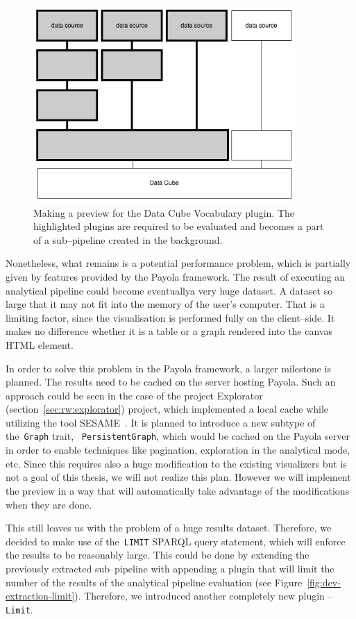 \begin{figure}
	\centering
	\includegraphics[width=100mm]{img/dcv-extraction.png}
	\caption{Making a preview for the Data Cube Vocabulary plugin. The highlighted
	plugins are required to be evaluated and becomes a part of a sub--pipeline created
	in the background.}
	\label{fig:dcv-extraction}
\end{figure}

Nonetheless, what remains is a potential performance problem, which is partially given 
by features provided by the Payola framework. The result of executing an 
analytical pipeline could become eventuallya very huge dataset. A dataset so 
large that it may not fit into the memory of the user's computer. That is a 
limiting factor, since the visualisation is performed fully on the client--side. 
It makes no difference whether it is a table or a graph rendered into the canvas HTML element.

In order to solve this problem in the Payola framework, a larger milestone is 
planned. The results need to be cached on the server hosting Payola.
Such an approach could be seen in the case of the project 
Explorator (section~\ref{sec:rw:explorator}) project, which implemented a local cache
while utilizing the tool SESAME~\cite{sesame}. It is planned to introduce a new 
subtype of the~\texttt{Graph} trait, ~\texttt{PersistentGraph}, which would be 
cached on the Payola server in order to enable techniques like pagination, 
exploration in the analytical mode, etc. Since this requires also a huge 
modification to the existing visualizers but is not a goal of this thesis, we will 
not realize this plan. However we will implement the preview in a way that will 
automatically take advantage of the modifications when they are done.

This still leaves us with the problem of a huge results dataset. Therefore, we 
decided to make use of the~\texttt{LIMIT} SPARQL query statement, which will 
enforce the results to be reasonably large. This could be done by 
extending the previously extracted sub--pipeline with appending a plugin that 
will limit the number of the results of the analytical
pipeline evaluation (see Figure~\ref{fig:dcv-extraction-limit}). Therefore, we 
introduced another completely new plugin -- \texttt{Limit}.

